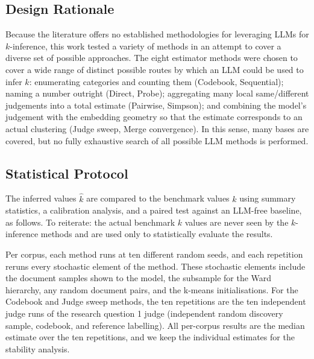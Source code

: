 \documentclass[11pt,a4paper,oneside]{report}
\begin{document}
\subsection{Design Rationale}

Because the literature offers no established methodologies for leveraging LLMs for $k$-inference, this work tested a variety of methods in an attempt to cover a diverse set of possible approaches. The eight estimator methods were chosen to cover a wide range of distinct possible routes by which an LLM could be used to infer $k$: enumerating categories and counting them (Codebook, Sequential); naming a number outright (Direct, Probe); aggregating many local same/different judgements into a total estimate (Pairwise, Simpson); and combining the model's judgement with the embedding geometry so that the estimate corresponds to an actual clustering (Judge sweep, Merge convergence). In this sense, many bases are covered, but no fully exhaustive search of all possible LLM methods is performed.

\subsection{Statistical Protocol} \label{sec:RQ2_STATPROT}

The inferred values $\hat{k}$ are compared to the benchmark values $k$ using summary statistics, a calibration analysis, and a paired test against an LLM-free baseline, as follows. To reiterate: the actual benchmark $k$ values are never seen by the $k$-inference methods and are used only to statistically evaluate the results.

Per corpus, each method runs at ten different random seeds, and each repetition reruns every stochastic element of the method.  These stochastic elements include the document samples shown to the model, the subsample for the Ward hierarchy, any random document pairs, and the k-means initialisations. For the Codebook and Judge sweep methods, the ten repetitions are the ten independent judge runs of the research question 1 judge (independent random discovery sample, codebook, and reference labelling). All per-corpus results are the median estimate over the ten repetitions, and we keep the individual estimates for the stability analysis.
\end{document}
